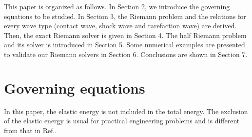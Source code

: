 \documentclass[review]{elsarticle}
\numberwithin{equation}{section}
\numberwithin{table}{section}
\begin{document}

This paper is organized as follows. In Section 2, we introduce the governing equations to be studied. In Section 3, the Riemann problem and the relations for every wave type (contact wave, shock wave and rarefaction wave) are  derived.  Then,  the exact Riemann solver  is given in Section 4. The half Riemann problem and its solver is introduced in Section 5.  Some numerical examples are presented to validate our Riemann solvers in Section 6.  Conclusions are shown in Section 7.

\section{Governing equations}
In this paper, the elastic energy is not included in the total energy. The exclusion of the elastic energy is usual for practical engineering problems \cite{maire2013nominally} and is different from that in Ref.\cite{gavrilyuk2008modelling}.
\end{document}

